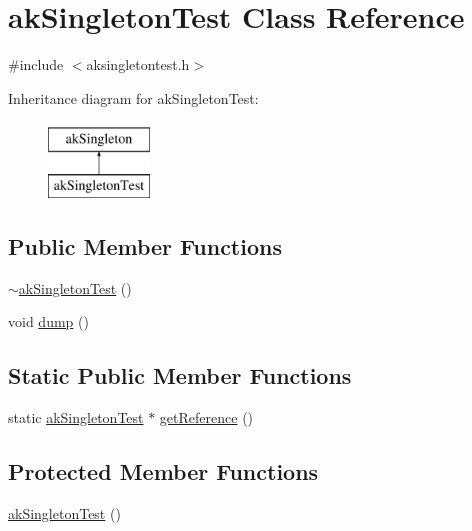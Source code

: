 \hypertarget{classakSingletonTest}{\section{ak\-Singleton\-Test Class Reference}
\label{classakSingletonTest}
}


{\ttfamily \#include $<$aksingletontest.\-h$>$}

Inheritance diagram for ak\-Singleton\-Test\-:\begin{figure}[H]
\begin{center}
\leavevmode
\includegraphics[height=2.000000cm]{classakSingletonTest}
\end{center}
\end{figure}
\subsection*{Public Member Functions}
\begin{DoxyCompactItemize}
\item 
\hyperlink{classakSingletonTest_a82107dda3518b31bb4e28333735f2e7d}{$\sim$ak\-Singleton\-Test} ()
\item 
void \hyperlink{classakSingletonTest_af45b897fec455882164f13b8865a3b3e}{dump} ()
\end{DoxyCompactItemize}
\subsection*{Static Public Member Functions}
\begin{DoxyCompactItemize}
\item 
static \hyperlink{classakSingletonTest}{ak\-Singleton\-Test} $\ast$ \hyperlink{classakSingletonTest_a0dde72606efb09c8d53a2dfd2aeaa79c}{get\-Reference} ()
\end{DoxyCompactItemize}
\subsection*{Protected Member Functions}
\begin{DoxyCompactItemize}
\item 
\hyperlink{classakSingletonTest_a8b16413a830e70b3dd6c4ecc7d14449f}{ak\-Singleton\-Test} ()
\end{DoxyCompactItemize}
